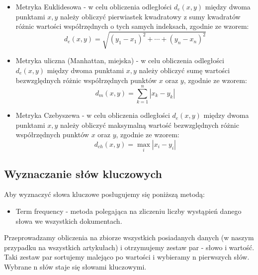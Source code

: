 \documentclass{classrep}
\begin{document}
\begin{itemize}[label=$\bullet$\scshape\bfseries]

\item Metryka Euklidesowa - w celu obliczenia odległości $ d_{e}(x,y) $ między dwoma punktami $ x, y $ należy obliczyć pierwiastek kwadratowy z sumy kwadratów różnic wartości współrzędnych o tych samych indeksach, zgodnie ze wzorem:
\begin{equation}
d_{e}(x,y)= \sqrt{ (y_{1} - x_{1})^2 + \cdots + (y_{n} - x_{n})^2 }
\end{equation}

\item Metryka uliczna (Manhattan, miejska) - w celu obliczenia odległości $ d_{e}(x,y) $ między dwoma punktami $ x, y $ należy obliczyć sumę wartości bezwzględnych różnic współrzędnych punktów $ x $ oraz $ y $, zgodnie ze wzorem:
\begin{equation}
d_{m}(x,y)= \sum_{k=1}^{n} | x_{k} - y_{k} |
\end{equation}

\item Metryka Czebyszewa - w celu obliczenia odległości $ d_{e}(x,y) $ między dwoma punktami $ x, y $ należy obliczyć maksymalną wartość bezwzględnych różnic współrzędnych punktów $ x $ oraz $ y $, zgodnie ze wzorem:
\begin{equation}
d_{ch}(x,y)= \max_{i} |x_{i} - y_{i}|
\end{equation}

\end{itemize}

\subsection{Wyznaczanie słów kluczowych}

Aby wyznaczyć słowa kluczowe posługujemy się poniższą metodą:

\begin{itemize}[label=$\bullet$\scshape\bfseries]
\item Term frequency - metoda polegająca na zliczeniu liczby wystąpień danego słowa we wszystkich dokumentach.
\end{itemize}

Przeprowadzamy obliczenia na zbiorze wszystkich posiadanych danych (w naszym przypadku na wszystkich artykułach) i otrzymujemy zestaw par - słowo i wartość. Taki zestaw par sortujemy malejąco po wartości i wybieramy n pierwszych słów. Wybrane n słów staje się słowami kluczowymi. \newline
\end{document}

